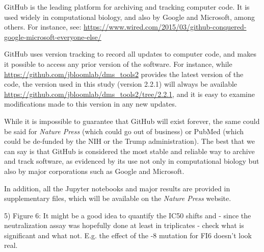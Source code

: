 \documentclass[11pt, oneside]{article}   	%
\begin{document}
{\color{black}
GitHub is the leading platform for archiving and tracking computer code.
It is used widely in computational biology, and also by Google and Microsoft, among others. For instance, see: \url{https://www.wired.com/2015/03/github-conquered-google-microsoft-everyone-else/}

GitHub uses version tracking to record all updates to computer code, and makes it possible to access any prior version of the software.
For instance, while \url{https://github.com/jbloomlab/dms_tools2} provides the latest version of the code, the version used in this study (version 2.2.1) will always be available \url{https://github.com/jbloomlab/dms_tools2/tree/2.2.1}, and it is easy to examine modifications made to this version in any new updates.

While it is impossible to guarantee that GitHub will exist forever, the same could be said for \textit{Nature Press} (which could go out of business) or PubMed (which could be de-funded by the NIH or the Trump administration).
The best that we can say is that GitHub is considered the most stable and reliable way to archive and track software, as evidenced by its use not only in computational biology but also by major corporations such as Google and Microsoft.

In addition, all the Jupyter notebooks and major results are provided in supplementary files, which will be available on the \textit{Nature Press} website.
}

5) Figure 6: It might be a good idea to quantify the IC50 shifts and - since the neutralization assay was hopefully done at least in triplicates - check what is significant and what not. E.g. the effect of the -8 mutation for FI6 doesn't look real. 
\end{document}
